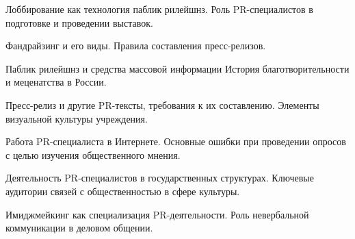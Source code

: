 \documentclass[
	14pt,
	a4paper,
	]
	{scrartcl}
\begin{document}
\vfill

\newpage


\shapk
{}
\setcounter{zad}{0}

\vfill
\z Лоббирование как технология паблик рилейшнз.
 \vfill
\z Роль PR-специалистов в подготовке и проведении выставок.
 \vfill

\vfill

\newpage


\shapk
{}
\setcounter{zad}{0}

\vfill
\z Фандрайзинг и его виды.
 \vfill
\z Правила составления пресс-релизов.
 \vfill

\vfill

\newpage


\shapk
{}
\setcounter{zad}{0}

\vfill
\z Паблик рилейшнз и средства массовой информации
 \vfill
\z История благотворительности и меценатства в России.
 \vfill

\vfill

\newpage


\shapk
{}
\setcounter{zad}{0}

\vfill
\z Пресс-релиз и другие PR-тексты, требования к их составлению.
 \vfill
\z Элементы визуальной культуры учреждения.
 \vfill

\vfill

\newpage


\shapk
{}
\setcounter{zad}{0}

\vfill
\z Работа PR-специалиста в Интернете.
 \vfill
\z Основные ошибки при проведении опросов с целью изучения общественного мнения.
 \vfill

\vfill

\newpage


\shapk
{}
\setcounter{zad}{0}

\vfill
\z Деятельность PR-специалистов в государственных структурах.
 \vfill
\z Ключевые аудитории связей с общественностью в сфере культуры.
 \vfill

\vfill

\newpage


\shapk
{}
\setcounter{zad}{0}

\vfill
\z Имиджмейкинг как специализация PR-деятельности.
 \vfill
\z Роль невербальной коммуникации в деловом общении.
 \vfill

\vfill
\end{document}
